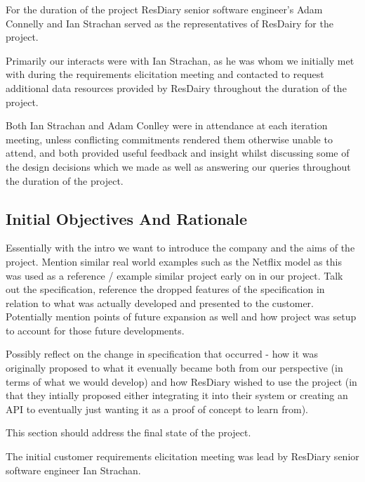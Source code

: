 \documentclass{l3proj}
\begin{document}
For the duration of the project ResDiary senior software engineer's Adam Connelly and Ian Strachan served as the representatives of ResDairy for the project. 

Primarily our interacts were with Ian Strachan, as he was whom we initially met with during the requirements elicitation meeting and contacted to request additional data resources provided by ResDairy throughout the duration of the project.

Both Ian Strachan and Adam Conlley were in attendance at each iteration meeting, unless conflicting commitments rendered them otherwise unable to attend, and both provided useful feedback and insight whilst discussing some of the design decisions which we made as well as answering our queries throughout the duration of the project.

\subsection{Initial Objectives And Rationale}
\label{initobjectives}

Essentially with the intro we want to introduce the company and the aims of the project. Mention similar real world examples such as the Netflix model as this was used as a reference / example similar project early on in our project. Talk out the specification, reference the dropped features of the specification in relation to what was actually developed and presented to the customer. Potentially mention points of future expansion as well and how project was setup to account for those future developments.

Possibly reflect on the change in specification that occurred - how it was originally proposed to what it evenually became both from our perspective (in terms of what we would develop) and how ResDiary wished to use the project (in that they intially proposed either integrating it into their system or creating an API to eventually just wanting it as a proof of concept to learn from).

This section should address the final state of the project.

The initial customer requirements elicitation meeting was lead by ResDiary senior software engineer Ian Strachan. 
\end{document}
